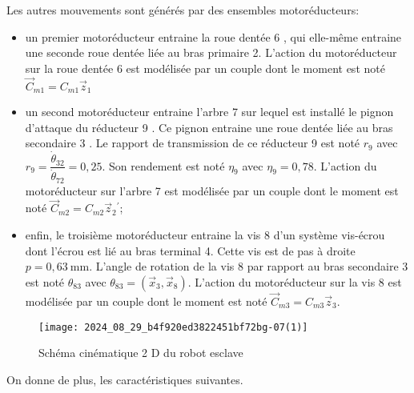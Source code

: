 Les autres mouvements sont générés par des ensembles motoréducteurs:
\begin{itemize}
  \item un premier motoréducteur entraine la roue dentée 6 , qui elle-même entraine une seconde roue dentée liée au bras primaire 2. L'action du motoréducteur sur la roue dentée 6 est modélisée par un couple dont le moment est noté $\vec{C}_{m 1}=C_{m 1} \vec{z}_{1}$
  \item un second motoréducteur entraine l'arbre 7 sur lequel est installé le pignon d'attaque du réducteur 9 . Ce pignon entraine une roue dentée liée au bras secondaire 3 . Le rapport de transmission de ce réducteur 9 est noté $r_{9}$ avec $r_{9}=\dfrac{\dot{\theta}_{32}}{\dot{\theta}_{72}}=0,25$. Son rendement est noté $\eta_{9}$ avec $\eta_{9}=0,78$. L'action du motoréducteur sur l'arbre 7 est modélisée par un couple dont le moment est noté $\vec{C}_{m 2}=C_{m 2} \vec{z}_{2}{ }^{\prime}$;
  \item enfin, le troisième motoréducteur entraine la vis 8 d'un système vis-écrou dont l'écrou est lié au bras terminal 4. Cette vis est de pas à droite $p=0,63 \mathrm{~mm}$. L'angle de rotation de la vis 8 par rapport au bras secondaire 3 est noté $\theta_{83}$ avec $\theta_{83}=\left(\vec{x}_{3}, \vec{x}_{8}\right)$. L'action du motoréducteur sur la vis 8 est modélisée par un couple dont le moment est noté $\vec{C}_{m 3}=C_{m 3} \vec{z}_{3}$.
\end{itemize}


\begin{figure}[!h]
\centering
\texttt{[image: 2024\_08\_29\_b4f920ed3822451bf72bg-07(1)]}
\caption{\label{fig_07} Schéma cinématique 2 D du robot esclave}
\end{figure}

On donne de plus, les caractéristiques suivantes.

